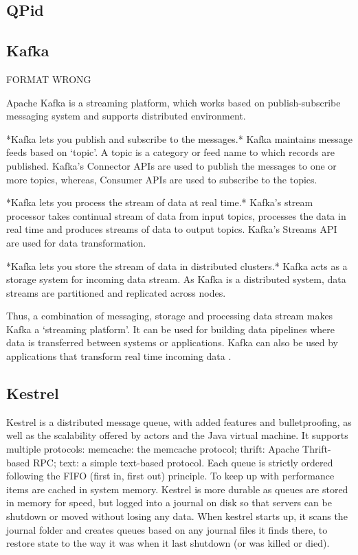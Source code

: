      \pv

     
\subsection{QPid}

\pv

\subsection{Kafka}

     FORMAT WRONG 

     Apache Kafka is a streaming platform, which works based on
     publish-subscribe messaging system and supports distributed
     environment.
      
     *Kafka lets you publish and subscribe to the messages.* Kafka
     maintains message feeds based on ‘topic’. A topic is a category
     or feed name to which records are published. Kafka’s Connector
     APIs are used to publish the messages to one or more topics,
     whereas, Consumer APIs are used to subscribe to the topics.

     *Kafka lets you process the stream of data at real time.* Kafka’s
     stream processor takes continual stream of data from input
     topics, processes the data in real time and produces streams of
     data to output topics. Kafka’s Streams API are used for data
     transformation.

     *Kafka lets you store the stream of data in distributed
     clusters.* Kafka acts as a storage system for incoming data
     stream. As Kafka is a distributed system, data streams are
     partitioned and replicated across nodes.

     Thus, a combination of messaging, storage and processing data
     stream makes Kafka a ‘streaming platform’. It can be used for
     building data pipelines where data is transferred between systems
     or applications. Kafka can also be used by applications that
     transform real time incoming data \cite{www-kafka}.

     \pv

\subsection{Kestrel}
     
     Kestrel is a distributed message queue, with added features and
     bulletproofing, as well as the scalability offered by actors and
     the Java virtual machine. It supports multiple protocols:
     memcache: the memcache protocol; thrift: Apache Thrift-based RPC;
     text: a simple text-based protocol. Each queue is strictly
     ordered following the FIFO (first in, first out) principle. To
     keep up with performance items are cached in system
     memory. Kestrel is more durable as queues are stored in memory
     for speed, but logged into a journal on disk so that servers can
     be shutdown or moved without losing any data. When kestrel starts
     up, it scans the journal folder and creates queues based on any
     journal files it finds there, to restore state to the way it was
     when it last shutdown (or was killed or died).

